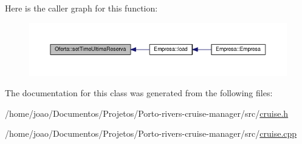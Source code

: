 Here is the caller graph for this function\+:\nopagebreak
\begin{figure}[H]
\begin{center}
\leavevmode
\includegraphics[width=350pt]{classOferta_a50c041d2301a351f2ac69ed235175116_icgraph}
\end{center}
\end{figure}




The documentation for this class was generated from the following files\+:\begin{DoxyCompactItemize}
\item 
/home/joao/\+Documentos/\+Projetos/\+Porto-\/rivers-\/cruise-\/manager/src/\hyperlink{cruise_8h}{cruise.\+h}\item 
/home/joao/\+Documentos/\+Projetos/\+Porto-\/rivers-\/cruise-\/manager/src/\hyperlink{cruise_8cpp}{cruise.\+cpp}\end{DoxyCompactItemize}
